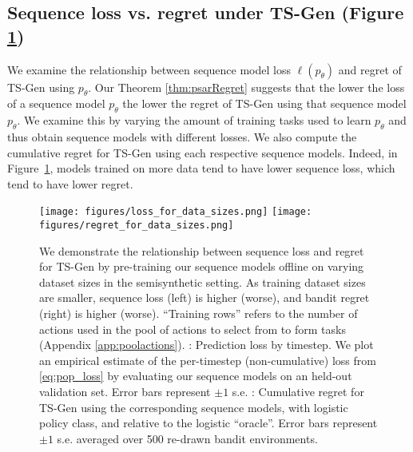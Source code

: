 \subsection{Sequence loss vs. regret under TS-Gen (Figure \ref{fig:loss_vs_regret})}
\label{app:seqloss}
We examine the relationship between sequence model loss $\ell(p_\theta)$ and regret of TS-Gen using $p_\theta$. Our Theorem \ref{thm:psarRegret} suggests that the lower the loss of a sequence model $p_\theta$ the lower the regret of TS-Gen using that sequence model $p_\theta$. We examine this by varying the amount of training tasks used to learn $p_\theta$ and thus obtain sequence models with different losses. We also compute the cumulative regret for TS-Gen using each respective sequence models. Indeed, in Figure~\ref{fig:loss_vs_regret}, models trained on more data tend to have lower sequence loss, which tend to have lower regret. 
\label{sec:loss_vs_regret}
\begin{figure}[h]
    \centering
\texttt{[image: figures/loss\_for\_data\_sizes.png]}
\texttt{[image: figures/regret\_for\_data\_sizes.png]}
\caption{ 
We demonstrate the relationship between sequence loss and regret for TS-Gen by pre-training our sequence models offline on varying dataset sizes in the semisynthetic setting. As training dataset sizes are smaller, sequence loss (left) is higher (worse), and bandit regret (right) is higher (worse). ``Training rows'' refers to the number of actions used in the pool of actions to select from to form tasks (Appendix \ref{app:poolactions}).
: Prediction loss by timestep. We plot an empirical estimate of the per-timestep (non-cumulative) loss from \eqref{eq:pop_loss} by evaluating our sequence models on an held-out validation set.
Error bars represent $\pm 1$ s.e. %
: Cumulative regret for TS-Gen using the corresponding sequence models, with logistic policy class, and relative to the logistic ``oracle''. Error bars represent $\pm 1$ s.e. averaged over 500 re-drawn bandit environments.}
\label{fig:loss_vs_regret}
\end{figure}


